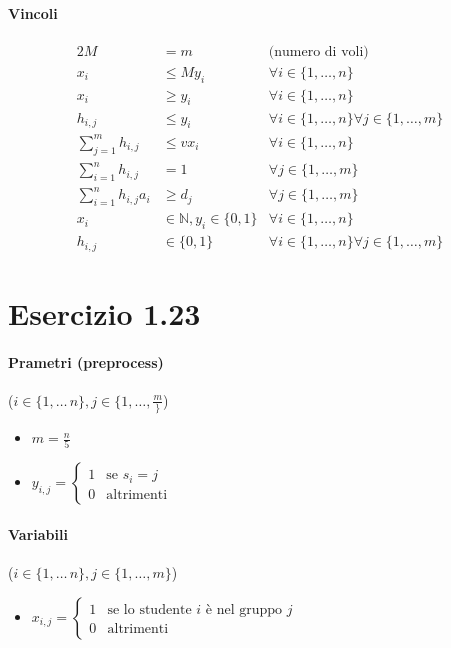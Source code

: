 \documentclass{article}
\begin{document}
\paragraph{Vincoli}
\begin{alignat}{2}
  M &= m &\text{(numero di voli)} \\
  x_i &\leq M y_i &\forall i \in \{1,\ldots,n\} \\
  x_i &\geq y_i &\forall i \in \{1,\ldots,n\} \\
  h_{i,j} &\leq y_i &\forall i \in \{1,\ldots,n\} \forall j \in \{1,\ldots,m\} \\
  \sum_{j=1}^m h_{i,j} &\leq v x_i &\forall i \in \{1,\ldots,n\} \\
  \sum_{i=1}^n h_{i,j} &= 1 &\forall j \in \{1,\ldots,m\} \\
  \sum_{i=1}^n h_{i,j} a_i &\geq d_j &\forall j \in \{1,\ldots,m\} \\
  x_i &\in \mathbb{N}, y_i \in \{0,1\} &\forall i \in \{1,\ldots,n\} \\
  h_{i,j} &\in \{0,1\} &\forall i \in \{1,\ldots,n\} \forall j \in \{1,\ldots,m\}
\end{alignat}

\pagebreak
\section{Esercizio 1.23}

\paragraph{Prametri (preprocess)} ($i \in \{1,\ldots\,n\}, j \in \{1,\ldots,\frac{m}\}$)

\begin{itemize}
  \item $m = \frac{n}{5}$
  \item $y_{i,j} = \begin{cases}
      1 & \text{se }s_i = j \\
      0 & \text{altrimenti}
  \end{cases}$
\end{itemize}

\paragraph{Variabili} ($i \in \{1,\ldots\,n\}, j \in \{1,\ldots,m\}$)
\begin{itemize}
  \item $x_{i,j} = \begin{cases}
      1 & \text{se lo studente }i\text{ \`e nel gruppo }j \\
      0 & \text{altrimenti}
  \end{cases}$
\end{itemize}
\end{document}
